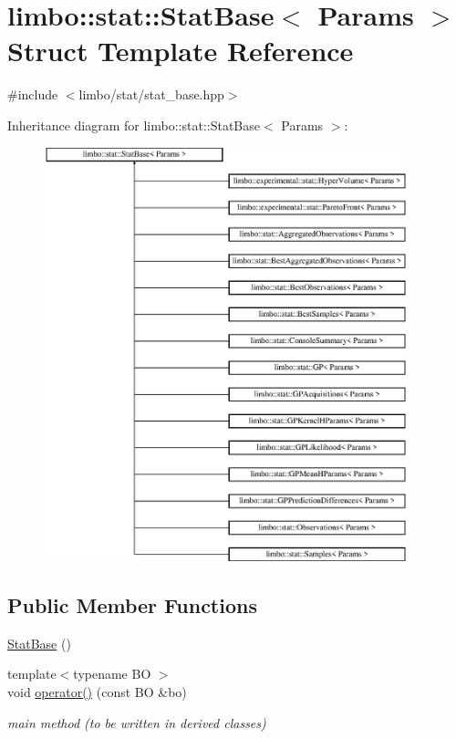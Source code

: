 \hypertarget{structlimbo_1_1stat_1_1_stat_base}{}\section{limbo\+:\+:stat\+:\+:Stat\+Base$<$ Params $>$ Struct Template Reference}
\label{structlimbo_1_1stat_1_1_stat_base}


{\ttfamily \#include $<$limbo/stat/stat\+\_\+base.\+hpp$>$}

Inheritance diagram for limbo\+:\+:stat\+:\+:Stat\+Base$<$ Params $>$\+:\begin{figure}[H]
\begin{center}
\leavevmode
\includegraphics[height=12.000000cm]{structlimbo_1_1stat_1_1_stat_base}
\end{center}
\end{figure}
\subsection*{Public Member Functions}
\begin{DoxyCompactItemize}
\item 
\hyperlink{structlimbo_1_1stat_1_1_stat_base_aac1bea59acf624ed728660823189006f}{Stat\+Base} ()
\item 
{\footnotesize template$<$typename B\+O $>$ }\\void \hyperlink{structlimbo_1_1stat_1_1_stat_base_a0d2a96eb80930e66a2d374160a20b040}{operator()} (const B\+O \&bo)
\begin{DoxyCompactList}\small\item\em main method (to be written in derived classes) \end{DoxyCompactList}\end{DoxyCompactItemize}


